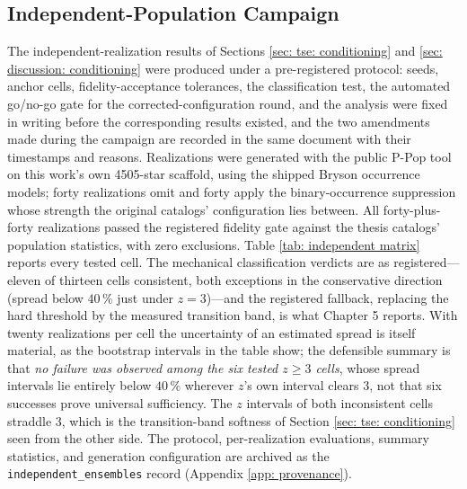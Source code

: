 \documentclass[12pt,a4paper]{article}
\numberwithin{equation}{section}
\numberwithin{figure}{section}
\numberwithin{table}{section}
\begin{document}
\subsection{Independent-Population Campaign} \label{app: independent campaign}
The independent-realization results of Sections \ref{sec: tse: conditioning} and \ref{sec: discussion: conditioning} were produced under a pre-registered protocol: seeds, anchor cells, fidelity-acceptance tolerances, the classification test, the automated go/no-go gate for the corrected-configuration round, and the analysis were fixed in writing before the corresponding results existed, and the two amendments made during the campaign are recorded in the same document with their timestamps and reasons. Realizations were generated with the public P-Pop tool on this work's own 4505-star scaffold, using the shipped Bryson occurrence models; forty realizations omit and forty apply the binary-occurrence suppression whose strength the original catalogs' configuration lies between. All forty-plus-forty realizations passed the registered fidelity gate against the thesis catalogs' population statistics, with zero exclusions. Table \ref{tab: independent matrix} reports every tested cell. The mechanical classification verdicts are as registered---eleven of thirteen cells consistent, both exceptions in the conservative direction (spread below $40\,\%$ just under $z=3$)---and the registered fallback, replacing the hard threshold by the measured transition band, is what Chapter 5 reports. With twenty realizations per cell the uncertainty of an estimated spread is itself material, as the bootstrap intervals in the table show; the defensible summary is that \emph{no failure was observed among the six tested $z\geq3$ cells}, whose spread intervals lie entirely below $40\,\%$ wherever $z$'s own interval clears 3, not that six successes prove universal sufficiency. The $z$ intervals of both inconsistent cells straddle 3, which is the transition-band softness of Section \ref{sec: tse: conditioning} seen from the other side. The protocol, per-realization evaluations, summary statistics, and generation configuration are archived as the \texttt{independent\_ensembles} record (Appendix \ref{app: provenance}).
\end{document}
